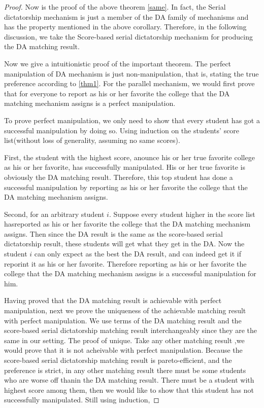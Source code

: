 \begin{proof}
Now is the proof of the above theorem \ref{same}.
In fact, the Serial dictatorship mechanism is just a member of the DA family of mechanisms and has the property mentioned in the above corollary. Therefore, in the following discussion, we take the Score-based serial dictatorship mechanism for producing the DA matching result.

Now we give a intuitionistic proof of the important theorem. The perfect manipulation of DA mechanism is just non-manipulation, that is, stating the true 
preference according to \ref{thm1}. For the parallel mechanism, we would first prove that for everyone to report as his or her favorite  the college that the DA matching mechanism assigns is a perfect manipulation. 

To prove perfect manipulation, we only need to show that every student has got a successful manipulation by doing so. Using induction on the students' score list(without loss of generality, assuming no same scores).

First, the student with the highest score, anounce his or her true favorite college as his or her favorite, has successfully manipulated. His or her true favorite is obviously the DA matching result. Therefore, this top student has done a successful manipulation by reporting as his or her favorite  the college that the DA matching mechanism assigns. 

Second, for  an arbitrary student $i$. Suppose every student higher in the score list hasreported as his or her favorite  the college that the DA matching mechanism assigns. Then since the DA result is the same as the score-based serial dictatorship result, these students will get what they get in the DA. Now the student $i$ can only expect as the best the DA result, and can indeed get it if reporint it as his or her favorite. Therefore reporting  as his or her favorite  the college that the DA matching mechanism assigns is a successful manipulation for him.

Having proved that the DA matching result is achievable with perfect manipulation, next we prove the uniqueness of the achievable matching result with perfect manipulation. We use terms of the DA matching result and the score-based serial dictatorship matching result interchangeably since they are the same in our setting.
The proof of unique. Take any other matching result ,we would prove that it is not acheivable with perfect manipulation. Because the score-based serial dictatorship matching result is pareto-efficient, and the preference is strict, in any other matching result there must be some students who are worse off thanin the DA matching result. There must be a student with highest score among them, then we would like to show that this student has not successfully manipulated. Still using induction, 


\end{proof}
